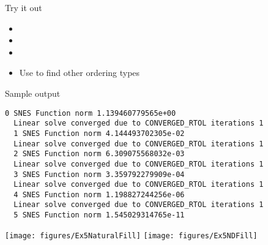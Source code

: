 \begin{frame}{Try it out}
   \\
  \begin{itemize}
  \item {}
  \item {}
  \item {}
  \item Use  to find other ordering types
\end{itemize}
\end{frame}

\begin{frame}[fragile]{Sample output}
\begin{Verbatim}[formatcom=\footnotesize]
  0 SNES Function norm 1.139460779565e+00 
  Linear solve converged due to CONVERGED_RTOL iterations 1
  1 SNES Function norm 4.144493702305e-02 
  Linear solve converged due to CONVERGED_RTOL iterations 1
  2 SNES Function norm 6.309075568032e-03 
  Linear solve converged due to CONVERGED_RTOL iterations 1
  3 SNES Function norm 3.359792279909e-04 
  Linear solve converged due to CONVERGED_RTOL iterations 1
  4 SNES Function norm 1.198827244256e-06 
  Linear solve converged due to CONVERGED_RTOL iterations 1
  5 SNES Function norm 1.545029314765e-11 
\end{Verbatim}
\vspace{-1em}
\texttt{[image: figures/Ex5NaturalFill]}
\texttt{[image: figures/Ex5NDFill]}
\end{frame}

